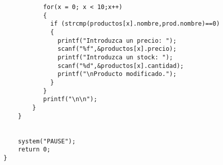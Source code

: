 \documentclass[a4paper, 10pt]{article}
\begin{document}
\begin{lstlisting}
           for(x = 0; x < 10;x++)
           {
             if (strcmp(productos[x].nombre,prod.nombre)==0)
             {
               printf("Introduzca un precio: ");
               scanf("%f",&productos[x].precio);
               printf("Introduzca un stock: ");
               scanf("%d",&productos[x].cantidad);
               printf("\nProducto modificado.");
             }
           }
           printf("\n\n");
        }
    }
       
   
    system("PAUSE");     
    return 0;
}
\end{lstlisting}
\end{document}
